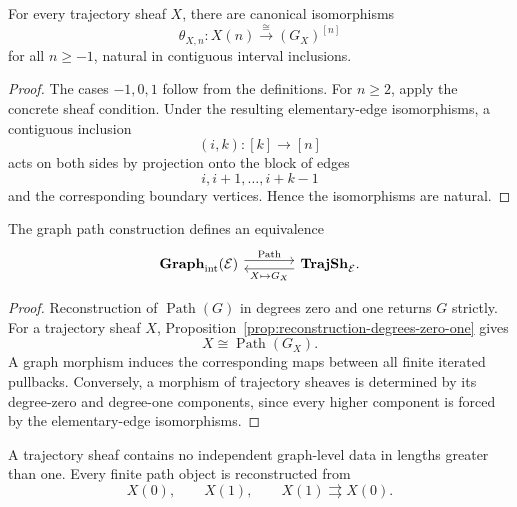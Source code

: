 \begin{proposition}
\label{prop:reconstruction-degrees-zero-one}
For every trajectory sheaf \(X\), there are canonical isomorphisms
\[
    \theta_{X,n}:
    X(n)
    \xrightarrow{\cong}
    (G_X)^{[n]}
\]
for all \(n\geq-1\), natural in contiguous interval inclusions.
\end{proposition}

\begin{proof}
The cases \(-1,0,1\) follow from the definitions. For \(n\geq2\), apply
the concrete sheaf condition. Under the resulting elementary-edge
isomorphisms, a contiguous inclusion
\[
    (i,k):[k]\to[n]
\]
acts on both sides by projection onto the block of edges
\[
    i,i+1,\ldots,i+k-1
\]
and the corresponding boundary vertices. Hence the isomorphisms are natural.
\end{proof}

\begin{theorem}
\label{thm:graph-trajectory-sheaf-equivalence}
The graph path construction defines an equivalence
\[
\begin{tikzcd}[column sep=large]
    \mathbf{Graph}_{\mathrm{int}}(\mathcal E)
        \arrow[r, shift left=0.7ex, "{\operatorname{Path}}"]
    &
    \mathbf{TrajSh}_{\mathcal E}
        \arrow[l, shift left=0.7ex, "{X\mapsto G_X}"] .
\end{tikzcd}
\]
\end{theorem}

\begin{proof}
Reconstruction of \(\operatorname{Path}(G)\) in degrees zero and one
returns \(G\) strictly. For a trajectory sheaf \(X\),
Proposition~\ref{prop:reconstruction-degrees-zero-one} gives
\[
    X\cong\operatorname{Path}(G_X).
\]
A graph morphism induces the corresponding maps between all finite iterated
pullbacks. Conversely, a morphism of trajectory sheaves is determined by its
degree-zero and degree-one components, since every higher component is
forced by the elementary-edge isomorphisms.
\end{proof}

\begin{corollary}
\label{cor:no-independent-higher-graph-data}
A trajectory sheaf contains no independent graph-level data in lengths
greater than one. Every finite path object is reconstructed from
\[
    X(0),
    \qquad
    X(1),
    \qquad
    X(1)\rightrightarrows X(0).
\]
\end{corollary}

